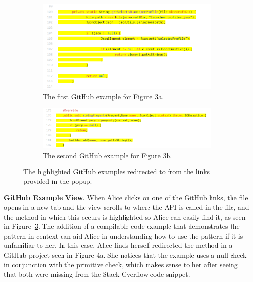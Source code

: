\begin{figure}
\centering
  \begin{subfigure}[a]{0.48\textwidth}
  \includegraphics[width=\textwidth]{json_primitive_gh1.PNG}
  \caption{The first GitHub example for Figure 3a.} 
  \vspace{.1in}
  \label{fig:github1}
  \end{subfigure}
  \hfill
  \begin{subfigure}[b]{0.48\textwidth}
  \includegraphics[width=\textwidth]{json_null_gh2.PNG}
  \caption{The second GitHub example for Figure 3b.}
  \vspace{.1in}
  \label{fig:github2}
  \end{subfigure}
  \hfill
\caption{The highlighted GitHub examples redirected to from the links provided in the popup.}
\label{fig:github_examples}
\end{figure}

{\bf GitHub Example View.} When Alice clicks on one of the GitHub links, the file opens in a new tab and the view scrolls to where the API is called in the file, and the method in which this occurs is highlighted so Alice can easily find it, as seen in Figure~\ref{fig:github_examples}. The addition of a compilable code example that demonstrates the pattern in context can aid Alice in understanding how to use the pattern if it is unfamiliar to her. In this case, Alice finds herself redirected the method in a GitHub project seen in Figure 4a. She notices that the example uses a null check in conjunction with the primitive check, which makes sense to her after seeing that both were missing from the Stack Overflow code snippet.

